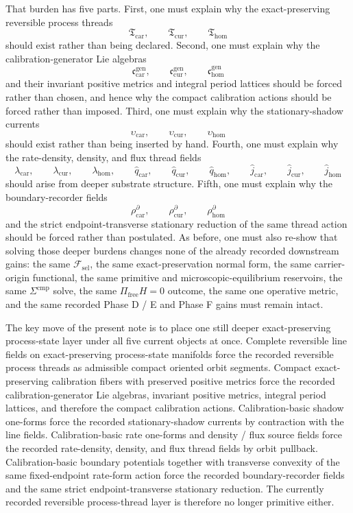 \documentclass[11pt]{article}
\newcommand{\StemFunctional}{\mathscr F_{\mathrm{sel}}}
\newcommand{\TensorThreadClass}{\mathfrak T_{\mathrm{car}}}
\newcommand{\CurThreadClass}{\mathfrak T_{\mathrm{cur}}}
\newcommand{\HomThreadClass}{\mathfrak T_{\mathrm{hom}}}
\newcommand{\TensorCalLie}{\mathfrak c_{\mathrm{car}}^{\mathrm{gen}}}
\newcommand{\CurCalLie}{\mathfrak c_{\mathrm{cur}}^{\mathrm{gen}}}
\newcommand{\HomCalLie}{\mathfrak c_{\mathrm{hom}}^{\mathrm{gen}}}
\newcommand{\TensorShadowDensity}{\upsilon_{\mathrm{car}}}
\newcommand{\CurShadowDensity}{\upsilon_{\mathrm{cur}}}
\newcommand{\HomShadowDensity}{\upsilon_{\mathrm{hom}}}
\newcommand{\TensorRateDensity}{\lambda_{\mathrm{car}}}
\newcommand{\CurRateDensity}{\lambda_{\mathrm{cur}}}
\newcommand{\HomRateDensity}{\lambda_{\mathrm{hom}}}
\newcommand{\TensorDensityField}{\widehat q_{\mathrm{car}}}
\newcommand{\CurDensityField}{\widehat q_{\mathrm{cur}}}
\newcommand{\HomDensityField}{\widehat q_{\mathrm{hom}}}
\newcommand{\TensorFluxField}{\widehat j_{\mathrm{car}}}
\newcommand{\CurFluxField}{\widehat j_{\mathrm{cur}}}
\newcommand{\HomFluxField}{\widehat j_{\mathrm{hom}}}
\newcommand{\TensorBoundaryRecorder}{\rho_{\mathrm{car}}^{\partial}}
\newcommand{\CurBoundaryRecorder}{\rho_{\mathrm{cur}}^{\partial}}
\newcommand{\HomBoundaryRecorder}{\rho_{\mathrm{hom}}^{\partial}}
\begin{document}
That burden has five parts. First, one must explain why the exact-preserving reversible process threads
\[
\TensorThreadClass,\qquad
\CurThreadClass,\qquad
\HomThreadClass
\]
should exist rather than being declared. Second, one must explain why the calibration-generator Lie algebras
\[
\TensorCalLie,\qquad
\CurCalLie,\qquad
\HomCalLie
\]
and their invariant positive metrics and integral period lattices should be forced rather than chosen, and hence why the compact calibration actions should be forced rather than imposed. Third, one must explain why the stationary-shadow currents
\[
\TensorShadowDensity,\qquad
\CurShadowDensity,\qquad
\HomShadowDensity
\]
should exist rather than being inserted by hand. Fourth, one must explain why the rate-density, density, and flux thread fields
\[
\TensorRateDensity,\qquad
\CurRateDensity,\qquad
\HomRateDensity,\qquad
\TensorDensityField,\qquad
\CurDensityField,\qquad
\HomDensityField,\qquad
\TensorFluxField,\qquad
\CurFluxField,\qquad
\HomFluxField
\]
should arise from deeper substrate structure. Fifth, one must explain why the boundary-recorder fields
\[
\TensorBoundaryRecorder,\qquad
\CurBoundaryRecorder,\qquad
\HomBoundaryRecorder
\]
and the strict endpoint-transverse stationary reduction of the same thread action should be forced rather than postulated. As before, one must also re-show that solving those deeper burdens changes none of the already recorded downstream gains: the same \(\StemFunctional\), the same exact-preservation normal form, the same carrier-origin functional, the same primitive and microscopic-equilibrium reservoirs, the same \(\Sigma^{\mathrm{cmp}}\) solve, the same \(\Pi_{\mathrm{free}}H=0\) outcome, the same one operative metric, and the same recorded Phase D / E and Phase F gains must remain intact.

The key move of the present note is to place one still deeper exact-preserving process-state layer under all five current objects at once. Complete reversible line fields on exact-preserving process-state manifolds force the recorded reversible process threads as admissible compact oriented orbit segments. Compact exact-preserving calibration fibers with preserved positive metrics force the recorded calibration-generator Lie algebras, invariant positive metrics, integral period lattices, and therefore the compact calibration actions. Calibration-basic shadow one-forms force the recorded stationary-shadow currents by contraction with the line fields. Calibration-basic rate one-forms and density / flux source fields force the recorded rate-density, density, and flux thread fields by orbit pullback. Calibration-basic boundary potentials together with transverse convexity of the same fixed-endpoint rate-form action force the recorded boundary-recorder fields and the same strict endpoint-transverse stationary reduction. The currently recorded reversible process-thread layer is therefore no longer primitive either.
\end{document}
